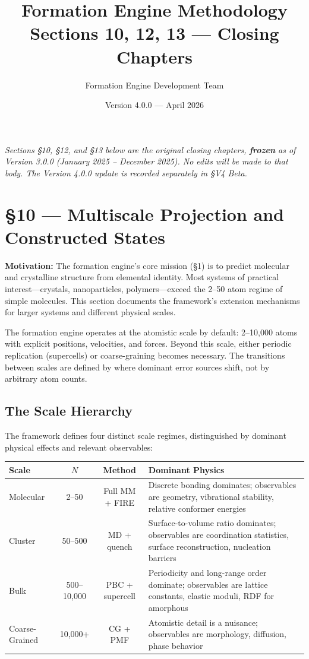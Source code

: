 \documentclass[11pt]{article}
\title{\textbf{Formation Engine Methodology} \\
\Large Sections 10, 12, 13 — Closing Chapters}
\author{Formation Engine Development Team}
\date{Version 4.0.0 --- April 2026}
\begin{document}
\maketitle

\tableofcontents

\begin{center}
\small\textit{Sections \S{}10, \S{}12, and \S{}13 below are the original closing chapters, \textbf{frozen} as of Version 3.0.0 (January 2025 -- December 2025). No edits will be made to that body. The Version 4.0.0 update is recorded separately in \S{}V4 Beta.}
\end{center}

\section{§10 — Multiscale Projection and Constructed States}

\textbf{Motivation:} The formation engine's core mission (§1) is to predict molecular and crystalline structure from elemental identity. Most systems of practical interest—crystals, nanoparticles, polymers—exceed the 2--50 atom regime of simple molecules. This section documents the framework's extension mechanisms for larger systems and different physical scales.

The formation engine operates at the atomistic scale by default: 2--10,000 atoms with explicit positions, velocities, and forces. Beyond this scale, either periodic replication (supercells) or coarse-graining becomes necessary. The transitions between scales are defined by where dominant error sources shift, not by arbitrary atom counts.

\subsection{The Scale Hierarchy}

The framework defines four distinct scale regimes, distinguished by dominant physical effects and relevant observables:

\begin{center}
\begin{tabular}{lccp{6cm}}
\toprule
Scale & $N$ & Method & Dominant Physics \\
\midrule
Molecular & 2--50 & Full MM + FIRE & Discrete bonding dominates; observables are geometry, vibrational stability, relative conformer energies \\
Cluster & 50--500 & MD + quench & Surface-to-volume ratio dominates; observables are coordination statistics, surface reconstruction, nucleation barriers \\
Bulk & 500--10,000 & PBC + supercell & Periodicity and long-range order dominate; observables are lattice constants, elastic moduli, RDF for amorphous \\
Coarse-Grained & 10,000+ & CG + PMF & Atomistic detail is a nuisance; observables are morphology, diffusion, phase behavior \\
\bottomrule
\end{tabular}
\end{center}
\end{document}
